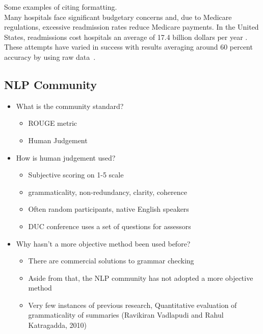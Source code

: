\documentclass[11pt,a4paper]{article}
\begin{document}
\begin{multicols}{2}
Some examples of citing formatting.\\

Many hospitals face significant budgetary concerns and, due to Medicare regulations, excessive readmission rates reduce Medicare payments. In the United States, readmissions cost hospitals an average of 17.4 billion dollars per year \cite{catlin2008}. These attempts have varied in success with results averaging around 60 percent accuracy by using raw data~\cite{kansagara2011}. 

\subsection{NLP Community}
\begin{itemize}
   \item What is the community standard?
   \begin{itemize}
      \item ROUGE metric
      \item Human Judgement
   \end{itemize}
   \item How is human judgement used?
   \begin{itemize}
      \item Subjective scoring on 1-5 scale
      \item grammaticality, non-redundancy, clarity, coherence
      \item Often random participants, native English speakers
      \item DUC conference uses a set of questions for assessors
   \end{itemize}
      \item Why hasn't a more objective method been used before?
   \begin{itemize}
      \item There are commercial solutions to grammar checking
      \item Aside from that, the NLP community has not adopted a more objective method
      \item Very few instances of previous research, Quantitative evaluation of grammaticality of summaries (Ravikiran Vadlapudi and Rahul Katragadda, 2010)
   \end{itemize}
\end{itemize}


\end{multicols}
\end{document}
